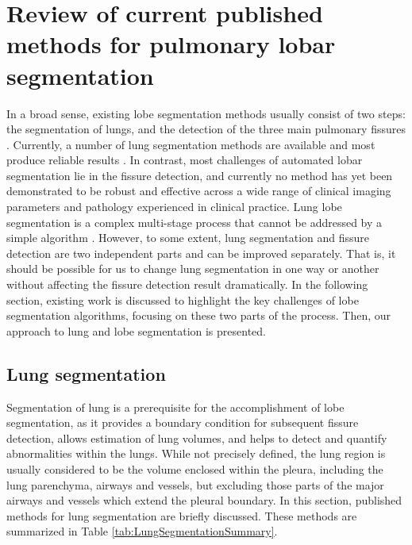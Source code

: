 \section{Review of current published methods for pulmonary lobar segmentation} \label{SegmentationReview}
In a broad sense, existing lobe segmentation methods usually consist of two steps: the segmentation of lungs, and the detection of the three main pulmonary fissures \citep{van2013automated}. Currently, a number of lung segmentation methods are available and most produce reliable results \citep{hu2001automatic,ukil2005smoothing,sun20063d,pu2008adaptive,wang2009automated}. In contrast, most challenges of automated lobar segmentation lie in the fissure detection, and currently no method has yet been demonstrated to be robust and effective across a wide range of clinical imaging parameters and pathology experienced in clinical practice. Lung lobe segmentation is a complex multi-stage process that cannot be addressed by a simple algorithm \citep{van2013automated,pu2009computational,ukil2009anatomy}. However, to some extent, lung segmentation and fissure detection are two independent parts and can be improved separately. That is, it should be possible for us to change lung segmentation in one way or another without affecting the fissure detection result dramatically. In the following section, existing work is discussed to highlight the key challenges of lobe segmentation algorithms, focusing on these two parts of the process. Then, our approach to lung and lobe segmentation is presented.

\subsection{Lung segmentation}
Segmentation of lung is a prerequisite for the accomplishment of lobe segmentation, as it provides a boundary condition for subsequent fissure detection, allows estimation of lung volumes, and helps to detect and quantify abnormalities within the lungs. While not precisely defined, the lung region is usually considered to be the volume enclosed within the pleura, including the lung parenchyma, airways and vessels, but excluding those parts of the major airways and vessels which extend the pleural boundary. In this section, published methods for lung segmentation are briefly discussed. These methods are summarized in Table \ref{tab:LungSegmentationSummary}.


